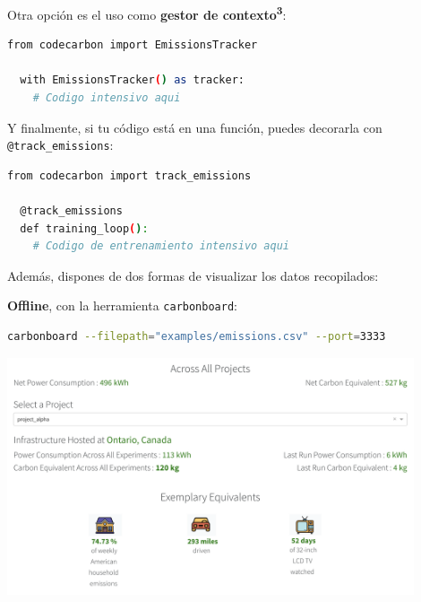\documentclass[12pt,a4paper]{report}
\begin{document}
Otra opción es el uso como \textbf{gestor de contexto\textsuperscript{3}}:

\begin{tcolorbox}[colback=codebackground, colframe=codeborder, boxrule=0.8pt, arc=0mm, boxsep=5pt, left=5pt, right=5pt, top=5pt, bottom=5pt]
  \begin{lstlisting}[language=bash]
  from codecarbon import EmissionsTracker

  with EmissionsTracker() as tracker:
    # Codigo intensivo aqui
  \end{lstlisting}
\end{tcolorbox}

Y finalmente, si tu código está en una función, puedes decorarla con
\texttt{@track\_emissions}:

\begin{tcolorbox}[colback=codebackground, colframe=codeborder, boxrule=0.8pt, arc=0mm, boxsep=5pt, left=5pt, right=5pt, top=5pt, bottom=5pt]
  \begin{lstlisting}[language=bash]
  from codecarbon import track_emissions

  @track_emissions
  def training_loop():
    # Codigo de entrenamiento intensivo aqui
  \end{lstlisting}
\end{tcolorbox}

Además, dispones de dos formas de visualizar los datos recopilados:

\textbf{Offline}, con la herramienta \texttt{carbonboard}:

\begin{tcolorbox}[colback=codebackground, colframe=codeborder, boxrule=0.8pt, arc=0mm, boxsep=5pt, left=5pt, right=5pt, top=5pt, bottom=5pt]
  \begin{lstlisting}[language=bash]
  carbonboard --filepath="examples/emissions.csv" --port=3333
  \end{lstlisting}
\end{tcolorbox}

\begin{center}
  \includegraphics[width=0.9\textwidth]{imagenes/CC_1.png}
\end{center}
\end{document}
